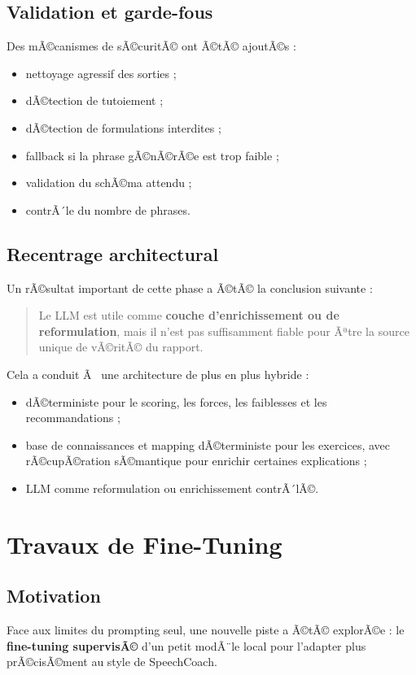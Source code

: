 ﻿\documentclass[12pt,a4paper]{article}
\begin{document}
\subsection{Validation et garde-fous}
Des mÃ©canismes de sÃ©curitÃ© ont Ã©tÃ© ajoutÃ©s :
\begin{itemize}
    \item nettoyage agressif des sorties ;
    \item dÃ©tection de tutoiement ;
    \item dÃ©tection de formulations interdites ;
    \item fallback si la phrase gÃ©nÃ©rÃ©e est trop faible ;
    \item validation du schÃ©ma attendu ;
    \item contrÃ´le du nombre de phrases.
\end{itemize}

\subsection{Recentrage architectural}
Un rÃ©sultat important de cette phase a Ã©tÃ© la conclusion suivante :
\begin{quote}
Le LLM est utile comme \textbf{couche d'enrichissement ou de reformulation}, mais il n'est pas suffisamment fiable pour Ãªtre la source unique de vÃ©ritÃ© du rapport.
\end{quote}

Cela a conduit Ã  une architecture de plus en plus hybride :
\begin{itemize}
    \item dÃ©terministe pour le scoring, les forces, les faiblesses et les recommandations ;
    \item base de connaissances et mapping dÃ©terministe pour les exercices, avec rÃ©cupÃ©ration sÃ©mantique pour enrichir certaines explications ;
    \item LLM comme reformulation ou enrichissement contrÃ´lÃ©.
\end{itemize}

\section{Travaux de Fine-Tuning}

\subsection{Motivation}
Face aux limites du prompting seul, une nouvelle piste a Ã©tÃ© explorÃ©e : le \textbf{fine-tuning supervisÃ©} d'un petit modÃ¨le local pour l'adapter plus prÃ©cisÃ©ment au style de SpeechCoach.
\end{document}
